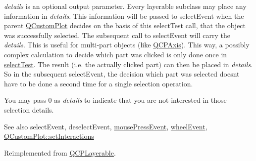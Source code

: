 {\itshape details} is an optional output parameter. Every layerable subclass may place any information in {\itshape details}. This information will be passed to select\+Event when the parent \hyperlink{class_q_custom_plot}{Q\+Custom\+Plot} decides on the basis of this select\+Test call, that the object was successfully selected. The subsequent call to select\+Event will carry the {\itshape details}. This is useful for multi-\/part objects (like \hyperlink{class_q_c_p_axis}{Q\+C\+P\+Axis}). This way, a possibly complex calculation to decide which part was clicked is only done once in \hyperlink{class_q_c_p_abstract_plottable_a38efe9641d972992a3d44204bc80ec1d}{select\+Test}. The result (i.\+e. the actually clicked part) can then be placed in {\itshape details}. So in the subsequent select\+Event, the decision which part was selected doesn\textquotesingle{}t have to be done a second time for a single selection operation.

You may pass 0 as {\itshape details} to indicate that you are not interested in those selection details.

\begin{DoxySeeAlso}{See also}
select\+Event, deselect\+Event, \hyperlink{class_q_c_p_layerable_af6567604818db90f4fd52822f8bc8376}{mouse\+Press\+Event}, \hyperlink{class_q_c_p_layerable_a47dfd7b8fd99c08ca54e09c362b6f022}{wheel\+Event}, \hyperlink{class_q_custom_plot_a5ee1e2f6ae27419deca53e75907c27e5}{Q\+Custom\+Plot\+::set\+Interactions} 
\end{DoxySeeAlso}


Reimplemented from \hyperlink{class_q_c_p_layerable_a04db8351fefd44cfdb77958e75c6288e}{Q\+C\+P\+Layerable}.



